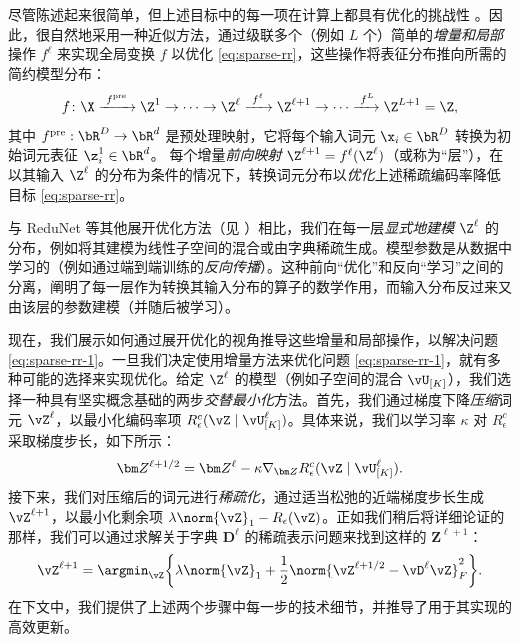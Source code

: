 \documentclass[../../book-main_zh.tex]{subfiles}
\begin{document}
尽管陈述起来很简单，但上述目标中的每一项在计算上都具有优化的挑战性 \cite{Wright-Ma-2022}。因此，很自然地采用一种近似方法，通过级联多个（例如 $L$ 个）简单的\textit{增量和局部}操作 $f^\ell$ 来实现全局变换 $f$ 以优化 \eqref{eq:sparse-rr}，这些操作将表征分布推向所需的简约模型分布：
\begin{equation}
    f\colon \X \xrightarrow{\hspace{1mm} f^{\mathrm{pre}} \hspace{1mm}}
    \Z^1 \rightarrow \cdots \rightarrow \Z^\ell
    \xrightarrow{\hspace{1mm} f^{\ell} \hspace{1mm}} \Z^{\ell+1}
    \rightarrow  \cdots \xrightarrow{\hspace{1mm} f^{L}} \Z^{L+1} = \Z,
    \label{eq:incremental}
\end{equation}
其中 $f^{\mathrm{pre}}: \bR^{D} \rightarrow \bR^{d}$ 是预处理映射，它将每个输入词元 $\x_{i} \in \bR^{D}$ 转换为初始词元表征 $\z_{i}^{1} \in \bR^{d}$。
每个增量\textit{前向映射} $\Z^{\ell + 1} = f^\ell(\Z^\ell)$（或称为“层”），在以其输入 $\Z^\ell$ 的分布为条件的情况下，转换词元分布以\textit{优化}上述稀疏编码率降低目标 \eqref{eq:sparse-rr}。

\begin{remark}
    与 ReduNet 等其他展开优化方法（见 ）相比，我们在每一层\textit{显式地建模} $\Z^\ell$ 的分布，例如将其建模为线性子空间的混合或由字典稀疏生成。模型参数是从数据中学习的（例如通过端到端训练的\textit{反向传播}）。这种前向“优化”和反向“学习”之间的分离，阐明了每一层作为转换其输入分布的算子的数学作用，而输入分布反过来又由该层的参数建模（并随后被学习）。
\end{remark}

现在，我们展示如何通过展开优化的视角推导这些增量和局部操作，以解决问题 \eqref{eq:sparse-rr-1}。一旦我们决定使用增量方法来优化问题 \eqref{eq:sparse-rr-1}，就有多种可能的选择来实现优化。给定 $\Z^\ell$ 的模型（例如子空间的混合 $\vU_{[K]}$），我们选择一种具有坚实概念基础的两步\textit{交替最小化}方法。首先，我们通过梯度下降\textit{压缩}词元 $\vZ^{\ell}$，以最小化编码率项 $R^c_\epsilon (\vZ \mid \vU_{[K]}^\ell)$。具体来说，我们以学习率 $\kappa$ 对 $R^c_\epsilon$ 采取梯度步长，如下所示：
\begin{align}\label{eq:Z l+1/2}
    \bm Z^{\ell+1/2} = \bm Z^\ell - \kappa \nabla_{\bm Z}
    R^c_\epsilon (\vZ \mid \vU_{[K]}^\ell).
\end{align}
接下来，我们对压缩后的词元进行\textit{稀疏化}，通过适当松弛的近端梯度步长生成 \(\vZ^{\ell + 1}\)，以最小化剩余项 $\lambda \norm{\vZ}_{1} - R_{\epsilon}(\vZ)$。正如我们稍后将详细论证的那样，我们可以通过求解关于字典 $\bm D^\ell$ 的稀疏表示问题来找到这样的 $\bm Z^{\ell+1}$：
\begin{equation}\label{eq:Z l+1}
    \vZ^{\ell+1} = \argmin_{{\vZ}}  \bigg\{\lambda \norm{\vZ}_1 +
    \frac{1}{2}\norm{\vZ^{\ell + 1/2} - \vD^{\ell} {\vZ}}_F^2\bigg\}.
\end{equation}
在下文中，我们提供了上述两个步骤中每一步的技术细节，并推导了用于其实现的高效更新。
\end{document}
